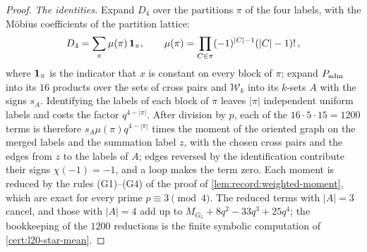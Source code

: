 \begin{proof}
\emph{The identities.} Expand $D_4$ over the partitions $\pi$ of the four labels,
with the M\"obius coefficients of the partition lattice:
\begin{equation}\label{eq:partition-coefficient}
 D_4=\sum_\pi\mu(\pi)\,\mathbf 1_\pi,\qquad
 \mu(\pi)=\prod_{C\in\pi}(-1)^{|C|-1}(|C|-1)!\,,
\end{equation}
where $\mathbf 1_\pi$ is the indicator that $x$ is constant on every block of $\pi$;
expand $P_{\rm adm}$ into its $16$ products over the sets of cross pairs and
$\mathcal W_k$ into its $k$-sets $A$ with the signs $s_A$. Identifying the labels
of each block of $\pi$ leaves $|\pi|$ independent uniform labels and costs the
factor $q^{4-|\pi|}$. After division by $p$, each of the $16\cdot5\cdot15=1200$
terms is therefore $s_A\mu(\pi)q^{4-|\pi|}$ times the moment of the oriented graph
on the merged labels and the summation label $z$, with the chosen cross pairs and
the edges from $z$ to the labels of $A$; edges reversed by the identification
contribute their signs $\chi(-1)=-1$, and a loop makes the term zero. Each moment
is reduced by the rules (G1)--(G4) of the proof of
\cref{lem:record:weighted-moment}, which are exact for every prime $p\equiv3
\pmod4$. The reduced terms with $|A|=3$ cancel, and those with $|A|=4$ add up to
$M_{G_5}+8q^2-33q^3+25q^4$; the bookkeeping of the $1200$ reductions is the
finite symbolic computation of \cref{cert:l20-star-mean}.


\end{proof}
